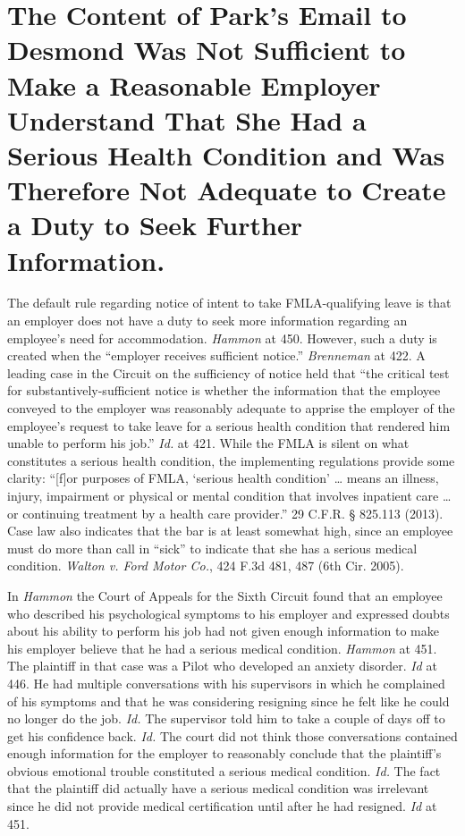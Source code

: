 \section{The Content of Park's Email to Desmond Was Not Sufficient to Make a Reasonable Employer Understand That She Had a Serious Health Condition and Was Therefore Not Adequate to Create a Duty to Seek Further Information.}
\label{thecontentofparksemailtodesmondwasnotsufficienttomakeareasonableemployerunderstandthatshehadaserioushealthconditionandwasthereforenotadequatetocreateadutytoseekfurtherinformation.}

The default rule regarding notice of intent to take FMLA-qualifying leave is that an employer does not have a duty to seek more information regarding an employee's need for accommodation. \emph{Hammon} at 450. However, such a duty is created when the ``employer receives sufficient notice.'' \emph{Brenneman} at 422. A leading case in the Circuit on the sufficiency of notice held that ``the critical test for substantively-sufficient notice is whether the information that the employee conveyed to the employer was reasonably adequate to apprise the employer of the employee's request to take leave for a serious health condition that rendered him unable to perform his job.'' \emph{Id.} at 421. While the FMLA is silent on what constitutes a serious health condition, the implementing regulations provide some clarity: ``[f]or purposes of FMLA, `serious health condition' {\ldots} means an illness, injury, impairment or physical or mental condition that involves inpatient care {\ldots} or continuing treatment by a health care provider.'' 29 C.F.R. § 825.113 (2013). Case law also indicates that the bar is at least somewhat high, since an employee must do more than call in ``sick'' to indicate that she has a serious medical condition. \emph{Walton v. Ford Motor Co.}, 424 F.3d 481, 487 (6th Cir. 2005).

In \emph{Hammon} the Court of Appeals for the Sixth Circuit found that an employee who described his psychological symptoms to his employer and expressed doubts about his ability to perform his job had not given enough information to make his employer believe that he had a serious medical condition. \emph{Hammon} at 451. The plaintiff in that case was a Pilot who developed an anxiety disorder. \emph{Id} at 446. He had multiple conversations with his supervisors in which he complained of his symptoms and that he was considering resigning since he felt like he could no longer do the job. \emph{Id.} The supervisor told him to take a couple of days off to get his confidence back. \emph{Id.} The court did not think those conversations contained enough information for the employer to reasonably conclude that the plaintiff's obvious emotional trouble constituted a serious medical condition. \emph{Id.} The fact that the plaintiff did actually have a serious medical condition was irrelevant since he did not provide medical certification until after he had resigned. \emph{Id} at 451.

